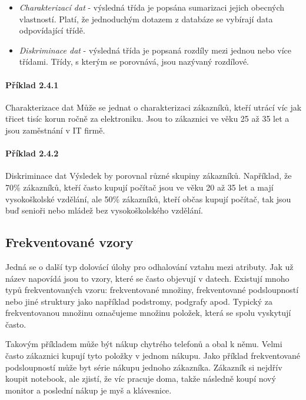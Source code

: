 \begin{itemize}
    \item \textit{Charakterizací dat} - výsledná třída je popsána sumarizaci jejich obecných vlastností. Platí, že jednoduchým dotazem z databáze se vybírají data odpovídající třídě.
    \item \textit{Diskriminace dat} - výsledná třída je popsaná rozdíly mezi jednou nebo více třídami. Třídy, s kterým se porovnává, jsou nazývaný rozdílové.
\end{itemize}

\paragraph{Příklad 2.4.1} Charakterizace dat \newline
Může se jednat o charakterizaci zákazníků, kteří utrácí víc jak třicet tisíc korun ročně za elektroniku. Jsou to zákaznici ve věku 25 až 35 let a jsou zaměstnání v IT firmě. 

\paragraph{Příklad 2.4.2} Diskriminace dat \newline
Výsledek by porovnal různé skupiny zákazníků. Například, že 70\% zákazníků, kteří často kupují počítač jsou ve věku 20 až 35 let a mají vysokoškolské vzdělání, ale 50\% zákazníků, kteří občas kupují počítač, tak jsou buď senioři nebo mládež bez vysokoškolského vzdělání.

\subsection*{Frekventované vzory}
Jedná se o další typ dolovácí úlohy pro odhalování vztahu mezi atributy. Jak už název napovídá jsou to vzory, které se často objevují v datech. Existují mnoho typů frekventovaných vzoru: frekventované množiny, frekventované podsloupností nebo jiné struktury jako například podstromy, podgrafy apod. Typický za frekventovanou množinu označujeme množinu položek, která se spolu vyskytují často. \cite{Han}

Takovým příkladem může být nákup chytrého telefonů a obal k němu. Velmi často zákaznici kupují tyto položky v jednom nákupu. Jako příklad frekventované podsloupností může byt  série nákupu jednoho zákazníka. Zákazník si nejdřív koupit notebook, ale zjistí, že víc pracuje doma, takže následně koupí nový monitor a poslední nákup je myš a klávesnice.

